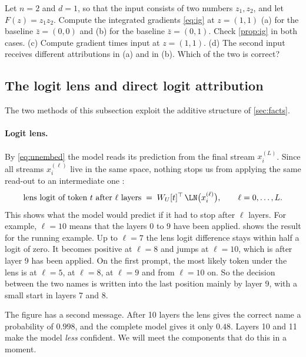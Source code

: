 \begin{exercise}\label{ex:baseline}
Let $n=2$ and $d=1$, so that the input consists of two numbers $z_1,z_2$, and let $F(z)=z_1z_2$. Compute the
integrated gradients \eqref{eq:ig} at $z=(1,1)$ (a) for the baseline $\bar z=(0,0)$ and (b) for the baseline
$\bar z=(0,1)$. Check \cref{prop:ig} in both cases. (c) Compute gradient times input at $z=(1,1)$. (d) The second
input receives different attributions in (a) and in (b). Which of the two is correct?
\end{exercise}

\subsection{The logit lens and direct logit attribution}
\label{sec:lens}

The two methods of this subsection exploit the additive structure of \cref{sec:facts}.

\paragraph{Logit lens.} By \eqref{eq:unembed} the model reads its prediction from the final stream $x_i^{(L)}$.
Since all streams $x_i^{(\ell)}$ live in the same space, nothing stops us from applying the same read-out to an
intermediate one \citep{nostalgebraist2020logit}:
\begin{equation}\label{eq:lens}
\text{lens logit of token $t$ after $\ell$ layers} \;=\; W_U[t]^\top\,\LN\big(x_i^{(\ell)}\big),\qquad \ell=0,\dots,L .
\end{equation}
This shows what the model would predict if it had to stop after $\ell$ layers. For example, $\ell=10$ means
that the layers $0$ to $9$ have been applied.  shows the result
for the running example. Up to $\ell=7$ the lens logit difference stays within half a logit of zero. It becomes
positive at $\ell=8$ and jumps at $\ell=10$, which is after layer 9 has been applied. On the first prompt, the most likely
token under the lens is  at $\ell=5$,  at $\ell=8$,  at $\ell=9$ and 
from $\ell=10$ on. So the decision between the two names is written into the last position mainly by layer 9,
with a small start in layers 7 and 8.

The figure has a second message. After 10 layers the lens gives the correct name a probability of $0.998$, and
the complete model gives it only $0.48$. Layers 10 and 11 make the model \emph{less} confident. We will meet the
components that do this in a moment.

